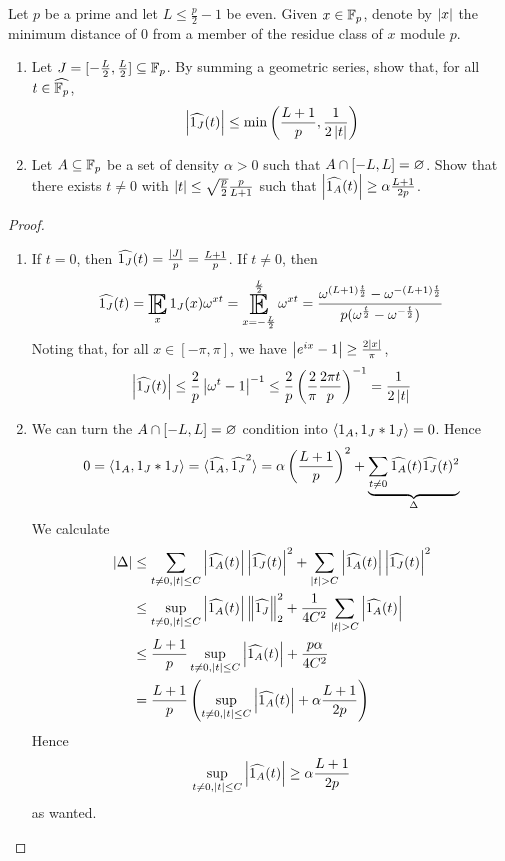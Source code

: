 \documentclass{article}
\begin{document}
\begin{problem}
  Let $p$ be a prime and let $L \le \frac p2 - 1$ be even. Given $x \in \mathbb F_p$, denote by $\left\lvert x\right\rvert$ the minimum distance of $0$ from a member of the residue class of $x$ module $p$.
  \begin{enumerate}
    \item Let $J = [-\frac L2, \frac L2] \subseteq \mathbb F_p$. By summing a geometric series, show that, for all $t \in \widehat{\mathbb F_p}$,
    $$\left\lvert \widehat{1_J}(t)\right\rvert \le \min\left(\frac{L + 1}p, \frac 1{2\left\lvert t\right\rvert}\right)$$
    \item Let $A \subseteq \mathbb F_p$ be a set of density $\alpha > 0$ such that $A \cap [-L, L] = \varnothing$. Show that there exists $t \ne 0$ with $\left\lvert t\right\rvert \le \sqrt{\frac p2}\frac p{L + 1}$ such that $\left\lvert \widehat{1_A}(t)\right\rvert \ge \alpha\frac{L + 1}{2p}$.
  \end{enumerate}
\end{problem}
\begin{proof}~
  \begin{enumerate}
    \item If $t = 0$, then $\widehat{1_J}(t) = \frac{\left\lvert J\right\rvert}p = \frac{L + 1}p$. If $t \ne 0$, then
    $$\widehat{1_J}(t) = \E_x 1_J(x) \omega^{xt} = \E_{x = -\frac L2}^{\frac L2} \omega^{xt} = \frac{\omega^{(L + 1)\frac t2} - \omega^{-(L + 1)\frac t2}}{p(\omega^{\frac t2} - \omega^{-\frac t2})}$$
    Noting that, for all $x \in [-\pi, \pi]$, we have $\left\lvert e^{ix} - 1\right\rvert \ge \frac{2\left\lvert x\right\rvert}\pi$,
    $$\left\lvert \widehat{1_J}(t)\right\rvert \le \frac 2p \left\lvert \omega^t - 1\right\rvert^{-1} \le \frac 2p \left(\frac 2\pi \frac{2\pi t}p\right)^{-1} = \frac 1{2\left\lvert t\right\rvert}$$
    \item We can turn the $A \cap [-L, L] = \varnothing$ condition into $\left\langle 1_A, 1_J \ast 1_J\right\rangle = 0$. Hence
    $$0 = \left\langle 1_A, 1_J \ast 1_J\right\rangle = \langle\widehat{1_A}, \widehat{1_J}^2\rangle = \alpha\left(\frac{L + 1}p\right)^2 + \underbrace{\sum_{t \ne 0} \widehat{1_A}(t)\widehat{1_J}(t)^2}_\Delta$$
    We calculate
    \begin{align*}
      \left\lvert \Delta\right\rvert
      & \le \sum_{t \ne 0, \left\lvert t\right\rvert \le C} \left\lvert \widehat{1_A}(t)\right\rvert\left\lvert \widehat{1_J}(t)\right\rvert^2 + \sum_{\left\lvert t\right\rvert > C} \left\lvert \widehat{1_A}(t)\right\rvert\left\lvert \widehat{1_J}(t)\right\rvert^2 \\
      & \le \sup_{t \ne 0, \left\lvert t\right\rvert \le C} \left\lvert \widehat{1_A}(t)\right\rvert \left\lVert \widehat{1_J}\right\rVert_2^2 + \frac 1{4C^2}\sum_{\left\lvert t\right\rvert > C} \left\lvert \widehat{1_A}(t)\right\rvert \\
      & \le \frac{L + 1}p \sup_{t \ne 0, \left\lvert t\right\rvert \le C} \left\lvert \widehat{1_A}(t)\right\rvert + \frac{p\alpha}{4C^2} \\
      & = \frac{L + 1}p \left(\sup_{t \ne 0, \left\lvert t\right\rvert \le C} \left\lvert \widehat{1_A}(t)\right\rvert + \alpha\frac{L + 1}{2p}\right)
    \end{align*}
    Hence
    $$\sup_{t \ne 0, \left\lvert t\right\rvert \le C} \left\lvert \widehat{1_A}(t)\right\rvert \ge \alpha\frac{L + 1}{2p}$$
    as wanted.
  \end{enumerate}
\end{proof}
\end{document}
